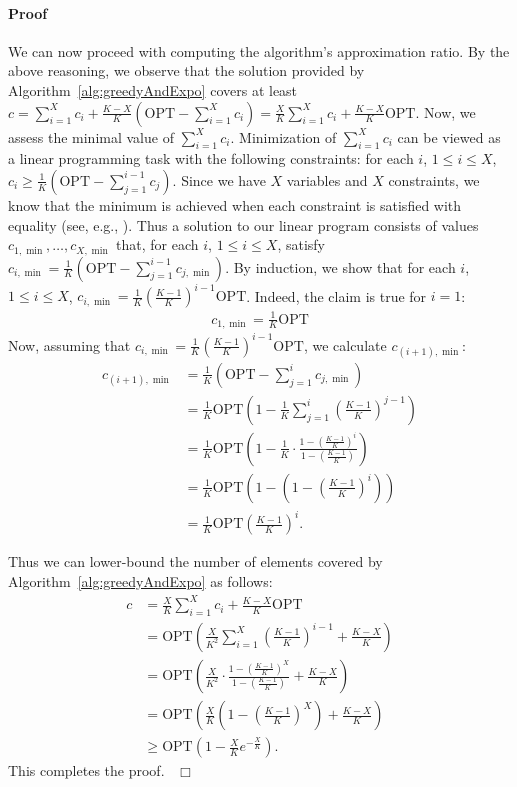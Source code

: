 \documentclass[11pt]{article}
\newcommand{\OPT}{{{{\mathrm{OPT}}}}}
\newenvironment{proof}{\paragraph{Proof}}{\hfill$\Box$\medskip}
\begin{document}
\begin{proof}
  We can now proceed with computing the algorithm's approximation
  ratio.  By the above reasoning, we observe that the solution
  provided by Algorithm~\ref{alg:greedyAndExpo} covers at least $c =
  \sum_{i=1}^{X} c_i + \frac{K-X}{K}(\OPT - \sum_{i = 1}^{X} c_i) =
  \frac{X}{K}\sum_{i=1}^{X} c_i + \frac{K-X}{K}\OPT$. Now, we assess
  the minimal value of $\sum_{i=1}^{X} c_i$. Minimization of
  $\sum_{i=1}^{X} c_i$ can be viewed as a linear programming task with
  the following constraints: for each $i$, $1 \leq i \leq X$, $c_i
  \geq \frac{1}{K}(\OPT - \sum_{j = 1}^{i-1} c_j)$.  Since we have $X$
  variables and $X$ constraints, we know that the minimum is achieved
  when each constraint is satisfied with equality (see, e.g.,
  \cite{Vazirani:2001:AA:500776}). Thus a solution to our linear
  program consists of values $c_{1, \min}, \ldots, c_{X,\min}$ that,
  for each $i$, $1 \leq i \leq X$, satisfy $c_{i, \min} =
  \frac{1}{K}(\OPT - \sum_{j = 1}^{i-1} c_{j, \min})$. By induction,
  we show that for each $i$, $1 \leq i \leq X$, $c_{i, \min} =
  \frac{1}{K}\left(\frac{K-1}{K}\right)^{i-1}\OPT$. Indeed, the claim
  is true for $i = 1$:
  \begin{align*}
    c_{1, \min} = \frac{1}{K}\OPT
  \end{align*}
  Now, assuming that $c_{i, \min} =
  \frac{1}{K}\left(\frac{K-1}{K}\right)^{i-1}\OPT$, we calculate
  $c_{(i+1), \min}$:
  \begin{align*}
    c_{(i+1), \min} &= \frac{1}{K}\left(\OPT - \sum_{j = 1}^{i} c_{j, \min}\right) \\
    &= \frac{1}{K}\OPT\left(1 - \frac{1}{K}\sum_{j = 1}^{i} \left(\frac{K-1}{K}\right)^{j-1}\right) \\
    &= \frac{1}{K}\OPT\left(1 - \frac{1}{K} \cdot \frac{1 - \left(\frac{K-1}{K}\right)^{i}}{1 - \left(\frac{K-1}{K}\right)}\right) \\
    &= \frac{1}{K}\OPT\left(1 - \left(1 - \left(\frac{K-1}{K}\right)^{i}\right)\right) \\
    &= \frac{1}{K}\OPT\left(\frac{K-1}{K}\right)^{i} \textrm{.}
  \end{align*}

  Thus we can lower-bound the number of elements covered by
  Algorithm~\ref{alg:greedyAndExpo} as follows:
  \begin{align*}
    c &= \frac{X}{K}\sum_{i=1}^{X} c_i + \frac{K-X}{K}\OPT \\
    &= \OPT\left(\frac{X}{K^2}\sum_{i=1}^{X}\left(\frac{K-1}{K}\right)^{i-1} + \frac{K-X}{K}\right) \\
    &= \OPT\left(\frac{X}{K^2} \cdot \frac{1 - \left(\frac{K-1}{K}\right)^{X}}{1 - \left(\frac{K-1}{K}\right)} + \frac{K-X}{K}\right) \\
    &= \OPT\left(\frac{X}{K}\left(1 - \left(\frac{K-1}{K}\right)^{X}\right) + \frac{K-X}{K}\right) \\
    &\geq \OPT\left(1 - \frac{X}{K}e^{-\frac{X}{K}}\right) \textrm{.}
  \end{align*}
  This completes the proof.~
\end{proof}
\end{document}
